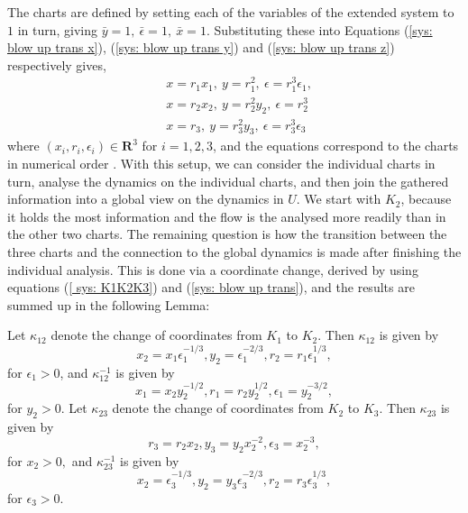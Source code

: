 The charts are defined by setting each of the variables of the extended system to $1$ in turn, giving $ \bar{y}=1, \ \bar{\epsilon}=1, \ \bar{x}=1 $. Substituting these into Equations (\ref{sys: blow up trans x}), (\ref{sys: blow up trans y}) and (\ref{sys: blow up trans z}) respectively gives, 
\begin{subequations} \label{ sys: K1K2K3}
	\begin{align}
	&x=r_1x_1, \ y=r_1^2, \ \epsilon=r_1^3\epsilon_1,\\
	&x=r_2x_2, \ y=r_2^2y_2, \ \epsilon=r_2^3 \label{sys: K2}\\
	&x=r_3, \ y=r_3^2y_3, \ \epsilon=r_3^3\epsilon_3\label{sys:K3}
	\end{align}
\end{subequations}
where $ (x_i,r_i,\epsilon_i)\in\mathbf{R}^3 $ for $ i=1,2,3 $, and the equations correspond to the charts in numerical order \citep{krupa2001}. 
With this setup, we can consider the individual charts in turn, analyse the dynamics on the individual charts, and then join the gathered information into a global view on the dynamics in $U$.
We start with $K_2$,  because it holds the most information and the flow is the analysed more readily than in the other two charts. 
The remaining question is how the transition between the three charts and the connection to the global dynamics is made after finishing the individual analysis.
This is done via a coordinate change, derived by using equations (\ref{ sys: K1K2K3}) and (\ref{sys: blow up trans}), and the results are summed up in the following Lemma:
\begin{lemma} \label{coord. change}
Let $\kappa_{12}$ denote the change of coordinates from $K_1$ to $K_2$. Then $\kappa_{12}$ is given by \\
\begin{equation}
x_2 = x_1 \epsilon_1^{-1/3},  y_2 = \epsilon_1^{-2/3}, r_2= r_1\epsilon_1^{1/3},
\end{equation}
for $\epsilon_1 >0$,
and $\kappa_{12}^{-1}$ is given by
\begin{equation}
x_1 = x_2y_2^{-1/2}, r_1 = r_2 y_2^{1/2}, \epsilon_1= y_2^{-3/2},
\end{equation}
for $y_2>0$.
Let $\kappa_{23}$ denote the change of coordinates from $K_2$ to $K_3$. Then $\kappa_{23}$ is given by
\begin{equation}
r_3 = r_2x_2, y_3= y_2x_2^{-2}, \epsilon_3 = x_2^{-3},
\end{equation}
for $x_2>0,$
and $\kappa_{23}^{-1}$  is given by
\begin{equation}
x_2 = \epsilon_3^{-1/3}, y_2 = y_3\epsilon_3^{-2/3}, r_2= r_3 \epsilon_3^{1/3},
\end{equation}
for $\epsilon_3>0$.
\end{lemma}

